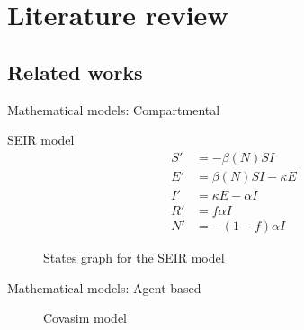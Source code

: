 \section{Literature review}

\subsection{Related works}

\begin{frame}{Mathematical models: Compartmental}
    \begin{block}{\gls{SEIR} model \cite{brauerCompartmentalModelsEpidemiology2008}}
        \begin{equation*}
            \begin{aligned}
                S' &= - \beta(N)SI \\
                E' &= \beta(N)SI - \kappa E \\
                I' &= \kappa E - \alpha I \\
                R' &= f \alpha I \\
                N' &= - (1 - f) \alpha I
            \end{aligned}
        \end{equation*}
    \end{block}

    \begin{figure}
        \centering
        \caption{States graph for the \gls{SEIR} model}
        \label{fig:seir-model-transition-graph}
    \end{figure}
\end{frame}

\begin{frame}{Mathematical models: Agent-based}
    \begin{figure}[!htb]
        \centering
        \caption{Covasim model \cite{kerrCovasimAgentbasedModel2021}}
        \label{fig:covasim-schematics}
    \end{figure}
\end{frame}


